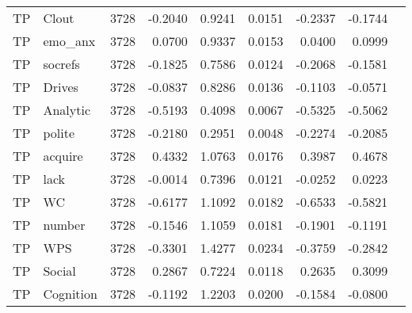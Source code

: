 \begin{longtable}{@{}llrrrrrrr@{}}
TP & Clout & 3728 & -0.2040 & 0.9241 & 0.0151 & -0.2337 & -0.1744 \\
TP & emo\_anx & 3728 & 0.0700 & 0.9337 & 0.0153 & 0.0400 & 0.0999 \\
TP & socrefs & 3728 & -0.1825 & 0.7586 & 0.0124 & -0.2068 & -0.1581 \\
TP & Drives & 3728 & -0.0837 & 0.8286 & 0.0136 & -0.1103 & -0.0571 \\
TP & Analytic & 3728 & -0.5193 & 0.4098 & 0.0067 & -0.5325 & -0.5062 \\
TP & polite & 3728 & -0.2180 & 0.2951 & 0.0048 & -0.2274 & -0.2085 \\
TP & acquire & 3728 & 0.4332 & 1.0763 & 0.0176 & 0.3987 & 0.4678 \\
TP & lack & 3728 & -0.0014 & 0.7396 & 0.0121 & -0.0252 & 0.0223 \\
TP & WC & 3728 & -0.6177 & 1.1092 & 0.0182 & -0.6533 & -0.5821 \\
TP & number & 3728 & -0.1546 & 1.1059 & 0.0181 & -0.1901 & -0.1191 \\
TP & WPS & 3728 & -0.3301 & 1.4277 & 0.0234 & -0.3759 & -0.2842 \\
TP & Social & 3728 & 0.2867 & 0.7224 & 0.0118 & 0.2635 & 0.3099 \\
TP & Cognition & 3728 & -0.1192 & 1.2203 & 0.0200 & -0.1584 & -0.0800 \\
\end{longtable}
\endgroup
